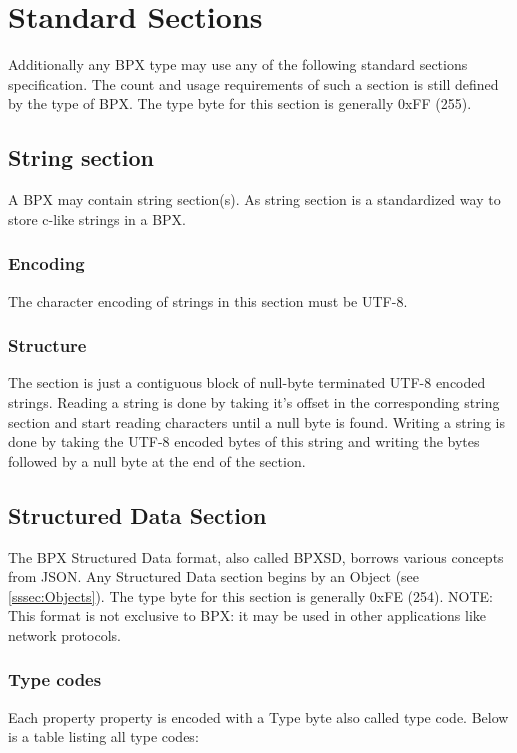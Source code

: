 \section{Standard Sections}

Additionally any BPX type may use any of the following standard sections specification. The count and usage requirements of such a section is still defined by the type of BPX. The type byte for this section is generally 0xFF (255).

\subsection{String section} \label{ssec:Strings}
A BPX may contain string section(s). As string section is a standardized way to store c-like strings in a BPX.

\subsubsection{Encoding}
The character encoding of strings in this section must be UTF-8.

\subsubsection{Structure}
The section is just a contiguous block of null-byte terminated UTF-8 encoded strings.\newline
Reading a string is done by taking it's offset in the corresponding string section and start reading characters until a null byte is found.\newline
Writing a string is done by taking the UTF-8 encoded bytes of this string and writing the bytes followed by a null byte at the end of the section.

\subsection{Structured Data Section} \label{ssec:Structured}
The BPX Structured Data format, also called BPXSD, borrows various concepts from JSON. Any Structured Data section begins by an Object (see \ref{sssec:Objects}). The type byte for this section is generally 0xFE (254).\newline
NOTE: This format is not exclusive to BPX: it may be used in other applications like network protocols.

\subsubsection{Type codes}
Each property property is encoded with a Type byte also called type code.  Below is a table listing all type codes:


